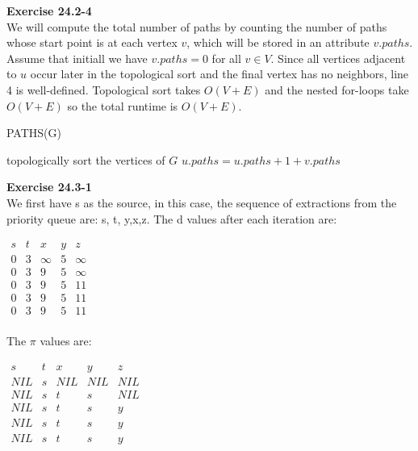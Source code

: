 \documentclass{article}
\begin{document}
\noindent\textbf{Exercise 24.2-4}\\

We will compute the total number of paths by counting the number of paths whose start point is at each vertex $v$, which will be stored in an attribute $v.paths$.  Assume that initiall we have $v.paths = 0$ for all $v \in V$.  Since all vertices adjacent to $u$ occur later in the topological sort and the final vertex has no neighbors, line 4 is well-defined. Topological sort takes $O(V+E)$ and the nested for-loops take $O(V+E)$ so the total runtime is $O(V+E)$.  \\

\begin{algorithm}
\caption{PATHS(G)}
\begin{algorithmic}[1]
\State topologically sort the vertices of $G$
		\State $u.paths = u.paths + 1 + v.paths$
	\EndFor
\EndFor
\end{algorithmic}
\end{algorithm}

\noindent\textbf{Exercise 24.3-1}\\

We first have s as the source, in this case, the sequence of extractions from the priority queue are: s, t, y,x,z. The d values after each iteration are:

\begin{center}
$
\begin{array}{|c|c|c|c|c|c|}
s&t&x&y&z\\
\hline
0&3&\infty&5&\infty\\
0&3&9&5&\infty\\
0&3&9&5&11\\
0&3&9&5&11\\
0&3&9&5&11\\
\end{array}
$
\end{center}


The $\pi$ values are:

\begin{center}
$
\begin{array}{|c|c|c|c|c|c|}
s&t&x&y&z\\
\hline
NIL&s&NIL&NIL&NIL\\
NIL&s&t&s&NIL\\
NIL&s&t&s&y\\
NIL&s&t&s&y\\
NIL&s&t&s&y\\
\end{array}
$
\end{center}
\end{document}
